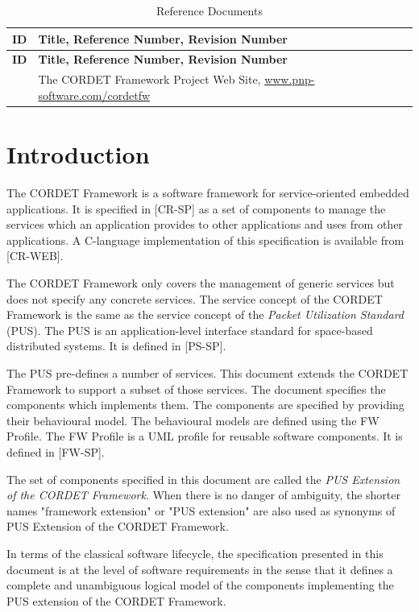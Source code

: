 \documentclass[a4paper,10pt]{article}
\let\stdsection\section
\renewcommand\section{\newpage\stdsection}
\begin{document}
\begin{longtable}{|c|p{11cm}|}
\caption{Reference Documents} \label{tab:refDoc}\\
\hline
\rowcolor{light-gray}
\textbf{ID} & \textbf{Title, Reference Number, Revision Number} \\
\hline\hline
\endfirsthead
\rowcolor{light-gray}
\textbf{ID} & \textbf{Title, Reference Number, Revision Number} \\
\hline\hline
\endhead
[PS-WEB] & The CORDET Framework Project Web Site, \url{www.pnp-software.com/cordetfw} \\
\hline
\end{longtable}


\newpage


\section{Introduction}
The CORDET Framework is a software framework for service-oriented embedded applications. It is specified in [CR-SP] as a set of components to manage the services which an application provides to other applications and uses from other applications. A C-language implementation of this specification is available from [CR-WEB].

The CORDET Framework only covers the management of generic services but does not specify any concrete services. The service concept of the CORDET Framework is the same as the service concept of the \textit{Packet Utilization Standard} (PUS). The PUS is an application-level interface standard for space-based distributed systems. It is defined in [PS-SP].

The PUS pre-defines a number of services. This document extends the CORDET Framework to support a subset of those services. The document specifies the components which implements them. The components are specified by providing their behavioural model. The behavioural models are defined using the FW Profile. The FW Profile is a UML profile for reusable software components. It is defined in [FW-SP].

The set of components specified in this document are called the \textit{PUS Extension of the CORDET Framework}. When there is no danger of ambiguity, the shorter names "framework extension" or "PUS extension" are also used as synonyms of PUS Extension of the CORDET Framework.

In terms of the classical software lifecycle, the specification presented in this document is at the level of software requirements in the sense that it defines a complete and unambiguous logical model of the components implementing the PUS extension of the CORDET Framework.
\end{document}
